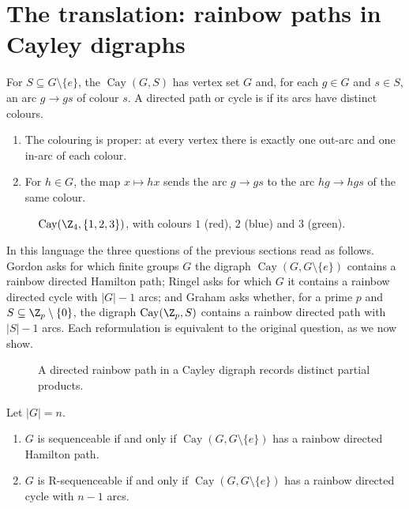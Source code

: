\section{The translation: rainbow paths in Cayley digraphs}\label{sec:rainbow-paths}

\begin{definition}\label{def:cayley-digraph}
For $S\subseteq G\setminus\{e\}$, the  $\operatorname{Cay}(G,S)$ has vertex set $G$ and, for each $g\in G$ and $s\in S$, an arc $g\to gs$ of colour $s$. A directed path or cycle is  if its arcs have distinct colours.
\end{definition}

\begin{lemma}\label{lem:cayley}
\leavevmode
\begin{enumerate}
\item The colouring is proper: at every vertex there is exactly one out-arc and one in-arc of each colour.
\item For $h\in G$, the map $x\mapsto hx$ sends the arc $g\to gs$ to the arc $hg\to hgs$ of the same colour.
\end{enumerate}
\end{lemma}

\begin{figure}[ht]
\centering

\caption{$\operatorname{Cay}(\Z_4,\{1,2,3\})$, with colours $1$ (red), $2$ (blue) and $3$ (green).}
\label{fig:cay-z4}
\end{figure}

In this language the three questions of the previous sections read as follows. Gordon asks for which finite groups $G$ the digraph $\operatorname{Cay}(G,G\setminus\{e\})$ contains a rainbow directed Hamilton path; Ringel asks for which $G$ it contains a rainbow directed cycle with $|G|-1$ arcs; and Graham asks whether, for a prime $p$ and $S\subseteq\Z_p\setminus\{0\}$, the digraph $\operatorname{Cay}(\Z_p,S)$ contains a rainbow directed path with $|S|-1$ arcs. Each reformulation is equivalent to the original question, as we now show.

\begin{figure}[ht]
\centering

\caption{A directed rainbow path in a Cayley digraph records distinct partial products.}
\label{fig:cayley-path}
\end{figure}

\begin{proposition}\label{prop:whole}
Let $|G|=n$.
\begin{enumerate}
\item $G$ is sequenceable if and only if $\operatorname{Cay}(G,G\setminus\{e\})$ has a rainbow directed Hamilton path.
\item $G$ is R-sequenceable if and only if $\operatorname{Cay}(G,G\setminus\{e\})$ has a rainbow directed cycle with $n-1$ arcs.
\end{enumerate}
\end{proposition}

